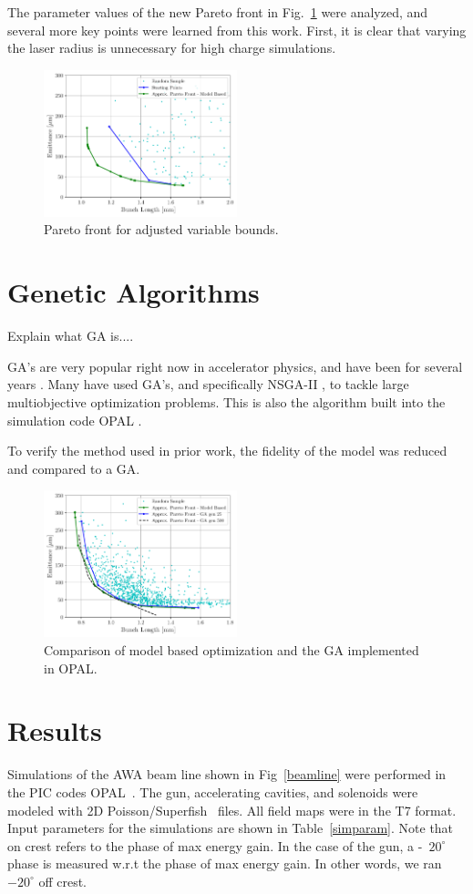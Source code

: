 \documentclass[letterpaper,  %
              ]{jacow-2_3}   %
\begin{document}
The parameter values of the new Pareto front in Fig.~\ref{paretob} were analyzed, and 
several more key points were learned from this work. 
First, it is clear that varying the laser radius is unnecessary for 
high charge simulations.
\begin{figure}
	\includegraphics[width=0.5\textwidth]{pareto_emittance_vs_zrms}
	\caption{Pareto front for adjusted variable bounds. }
	\label{paretob}
\end{figure}



\section{Genetic Algorithms}
Explain what GA is....


GA's are very popular right now in accelerator physics,
and have been for several years \cite{bazarov, ga2, ga3}. 
Many have used GA's, and specifically NSGA-II \cite{nsgaii}, 
to tackle large multiobjective optimization problems. 
This is also the algorithm built into the simulation code 
OPAL \cite{opal}. 

To verify the method used in prior work, the fidelity of the model
was reduced and compared to a GA. 
\begin{figure}
	\includegraphics[width=0.5\textwidth]{model_vs_ga}
	\caption{Comparison of model based optimization and the GA implemented in OPAL. }
	\label{compare}
\end{figure}


\section{Results}
Simulations of the AWA beam line shown in Fig~\ref{beamline}
were performed in the PIC codes OPAL~\cite{opal}.
The gun, accelerating cavities, and solenoids were modeled with 2D
Poisson/Superfish~\cite{fish} files. All field maps were in the T7 format.
Input parameters for the simulations are shown in Table~\ref{simparam}.
Note that on crest refers to the phase of max energy gain.
In the case of the gun, a -~$20^{\circ}$ phase is measured 
w.r.t the phase of max energy gain. 
In other words, we ran $-20^{\circ}$ off crest.
\end{document}
